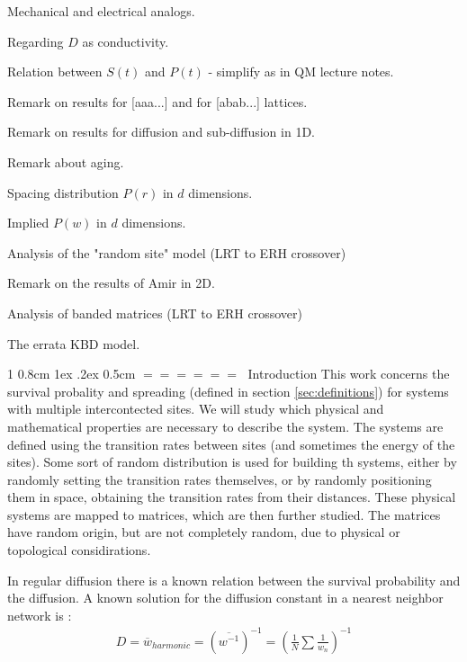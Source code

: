 \documentclass[onecolumn,fleqn,notitlepage,secnumarabic]{revtex4}
\makeatletter
\def\section{%
  \@startsection
    {section}%
    {1}%
    {\z@}%
    {0.8cm \@plus1ex \@minus .2ex}%
    {0.5cm}%
    {\Large\bf $=\!=\!=\!=\!=\!=\;$}%
}%
\makeatother
\begin{document}
Mechanical and electrical analogs.

Regarding $D$ as conductivity.

Relation between $S(t)$ and $P(t)$ - simplify as in QM lecture notes.

Remark on results for [aaa...] and for [abab...] lattices.

Remark on results for diffusion and sub-diffusion in 1D. 

Remark about aging.

Spacing distribution $P(r)$ in $d$ dimensions.

Implied $P(w)$ in $d$ dimensions. 

Analysis of the "random site" model (LRT to ERH crossover) 

Remark on the results of Amir in 2D. 

Analysis of banded matrices (LRT to ERH crossover)

The errata KBD model. 


\clearpage


\section{Introduction}
This work concerns the survival probality and spreading (defined in section \ref{sec:definitions}) for systems with multiple intercontected sites. We will study which physical and mathematical properties are necessary to describe the system. The systems are defined using the transition rates between sites (and sometimes the energy of the sites). Some sort of random distribution is used for building th systems, either by randomly setting the transition rates themselves, or by randomly positioning them in space, obtaining the transition rates from their distances. These physical systems are mapped to matrices, which are then further studied. The matrices have random origin, but are not completely random, due to physical or topological considirations.


In regular diffusion there is a known relation between the survival probability and the diffusion. 
A known solution for the diffusion constant in a nearest neighbor network is \cite{Derrida:1983}:
\begin{align}
D=\overline{w}_{harmonic} =(\overline{w^{-1}})^{-1}=\left(\frac{1}{N}\sum\frac{1}{w_n}\right)^{-1}
\end{align}
\end{document}
